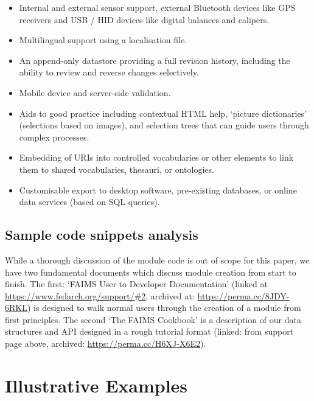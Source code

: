 \documentclass[preprint,12pt, a4paper]{elsarticle}
\begin{document}
\begin{itemize}
\item Internal and external sensor support, external Bluetooth devices like GPS receivers and USB / HID devices like digital balances and calipers.
\item Multilingual support using a localisation file.
\item An append-only datastore providing a full revision history, including the ability to review and reverse changes selectively.
\item Mobile device and server-side validation.
\item Aids to good practice including contextual HTML help, `picture dictionaries' (selections based on images), and selection trees that can guide users through complex processes.
\item Embedding of URIs into controlled vocabularies or other elements to link them to shared vocabularies, thesauri, or ontologies.
\item Customisable export to desktop software, pre-existing databases, or online data services (based on SQL queries).
\end{itemize}


\subsection{Sample code snippets analysis}


While a thorough discussion of the module code is out of scope for this paper, we have two fundamental documents which discuss module creation from start to finish. The first: `FAIMS User to Developer Documentation' (linked at \url{https://www.fedarch.org/support/\#2}, archived at: \url{https://perma.cc/8JDY-6RKL}) is designed to walk normal users through the creation of a module from first principles. The second `The FAIMS Cookbook' is a description of our data structures and API designed in a rough tutorial format (linked: from support page above, archived: \url{https://perma.cc/H6XJ-X6E2}).

\section{Illustrative Examples}
\end{document}
